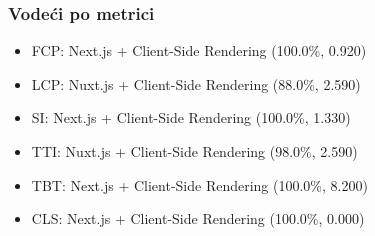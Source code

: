 \subsubsection{Vodeći po metrici}
\begin{itemize}
    \item FCP: Next.js + Client-Side Rendering (100.0\%, 0.920)
    \item LCP: Nuxt.js + Client-Side Rendering (88.0\%, 2.590)
    \item SI: Next.js + Client-Side Rendering (100.0\%, 1.330)
    \item TTI: Nuxt.js + Client-Side Rendering (98.0\%, 2.590)
    \item TBT: Next.js + Client-Side Rendering (100.0\%, 8.200)
    \item CLS: Next.js + Client-Side Rendering (100.0\%, 0.000)
\end{itemize}


